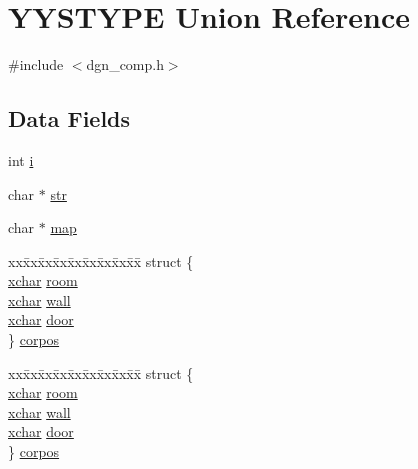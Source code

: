 \hypertarget{unionYYSTYPE}{\section{Y\+Y\+S\+T\+Y\+P\+E Union Reference}
\label{unionYYSTYPE}
}


{\ttfamily \#include $<$dgn\+\_\+comp.\+h$>$}

\subsection*{Data Fields}
\begin{DoxyCompactItemize}
\item 
int \hyperlink{unionYYSTYPE_ac818758881756c0236e9c66531f0981b}{i}
\item 
char $\ast$ \hyperlink{unionYYSTYPE_a5fdd8beefed5a63608bcbcd50aefd1b2}{str}
\item 
char $\ast$ \hyperlink{unionYYSTYPE_a14fe98d16d4d72e5a71858fb57f81275}{map}
\item 
\begin{tabbing}
xx\=xx\=xx\=xx\=xx\=xx\=xx\=xx\=xx\=\kill
struct \{\\
\>\hyperlink{global_8h_a2043b7d01ce89f4ee2fa6c345a752d32}{xchar} \hyperlink{unionYYSTYPE_a62b9dbce1487a64149e5610fb2743524}{room}\\
\>\hyperlink{global_8h_a2043b7d01ce89f4ee2fa6c345a752d32}{xchar} \hyperlink{unionYYSTYPE_ae43d89063af0a4a05dfde06619d90e7e}{wall}\\
\>\hyperlink{global_8h_a2043b7d01ce89f4ee2fa6c345a752d32}{xchar} \hyperlink{unionYYSTYPE_aec49c5d1cefb3c79cd696e7c5c5cf41d}{door}\\
\} \hyperlink{unionYYSTYPE_ab9c0c90ca4e13a1822d08a472f2b0a98}{corpos}\\

\end{tabbing}\item 
\begin{tabbing}
xx\=xx\=xx\=xx\=xx\=xx\=xx\=xx\=xx\=\kill
struct \{\\
\>\hyperlink{global_8h_a2043b7d01ce89f4ee2fa6c345a752d32}{xchar} \hyperlink{unionYYSTYPE_a62b9dbce1487a64149e5610fb2743524}{room}\\
\>\hyperlink{global_8h_a2043b7d01ce89f4ee2fa6c345a752d32}{xchar} \hyperlink{unionYYSTYPE_ae43d89063af0a4a05dfde06619d90e7e}{wall}\\
\>\hyperlink{global_8h_a2043b7d01ce89f4ee2fa6c345a752d32}{xchar} \hyperlink{unionYYSTYPE_aec49c5d1cefb3c79cd696e7c5c5cf41d}{door}\\
\} \hyperlink{unionYYSTYPE_a8b11f3ef52bee805402f4dce39f04341}{corpos}\\

\end{tabbing}\end{DoxyCompactItemize}


